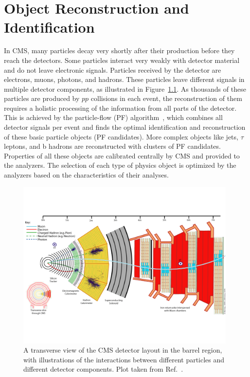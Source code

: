 \chapter{Object Reconstruction and Identification}\label{chp:objects}

In CMS, many particles decay very shortly after their production before they reach the detectors.
Some particles interact very weakly with detector material and do not leave electronic signals.
Particles received by the detector are electrons, muons, photons, and hadrons. 
These particles leave different signals in multiple detector components,
as illustrated in Figure~\ref{fig:cms_interact}.
As thousands of these particles are produced by $pp$ collisions in each event, 
the reconstruction of them requires a holistic processing of the information from all parts of the detector. 
This is achieved by the particle-flow (PF) algorithm~\cite{Sirunyan_2017}, which combines all detector signals per event
and finds the optimal identification and reconstruction of these basic particle objects (PF candidates).
More complex objects like jets, $\tau$ leptons, and b hadrons are reconstructed with clusters of PF candidates.
Properties of all these objects are calibrated centrally by CMS and provided to the analyzers.
The selection of each type of physics object is optimized by the analyzers based on the characteristics of their analyses.

\begin{figure}[!htb]
    \centering
    \includegraphics[width=0.98\textwidth]{pics/object_reco/CMS Slice.pdf}
    \caption{A transverse view of the CMS detector layout in the barrel region,
             with illustrations of the interactions between different particles and different detector components.
             Plot taken from Ref.~\cite{Davis:2205172}.}
    \label{fig:cms_interact}
\end{figure}

